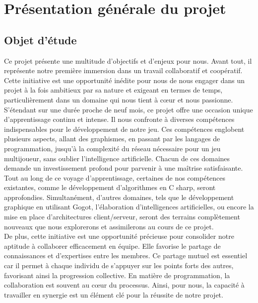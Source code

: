 \documentclass{article}
\begin{document}
\section{Présentation générale du projet}
\subsection{Objet d'étude}
Ce projet présente une multitude d'objectifs et d'enjeux pour nous. Avant tout, il représente notre première immersion dans un travail collaboratif et coopératif. Cette initiative est une opportunité inédite pour nous de nous engager dans un projet à la fois ambitieux par sa nature et exigeant en termes de temps, particulièrement dans un domaine qui nous tient à cœur et nous passionne.\\

S'étendant sur une durée proche de neuf mois, ce projet offre une occasion unique d'apprentissage continu et intense. Il nous confronte à diverses compétences indispensables pour le développement de notre jeu. Ces compétences englobent plusieurs aspects, allant des graphismes, en passant par les langages de programmation, jusqu'à la complexité du réseau nécessaire pour un jeu multijoueur, sans oublier l'intelligence artificielle. Chacun de ces domaines demande un investissement profond pour parvenir à une maîtrise satisfaisante.\\

Tout au long de ce voyage d'apprentissage, certaines de nos compétences existantes, comme le développement d'algorithmes en C sharp, seront approfondies. Simultanément, d'autres domaines, tels que le développement graphique en utilisant Gogot, l'élaboration d'intelligences artificielles, ou encore la mise en place d'architectures client/serveur, seront des terrains complètement nouveaux que nous explorerons et assimilerons au cours de ce projet.\\

De plus, cette initiative est une opportunité précieuse pour consolider notre aptitude à collaborer efficacement en équipe. Elle favorise le partage de connaissances et d'expertises entre les membres. Ce partage mutuel est essentiel car il permet à chaque individu de s'appuyer sur les points forts des autres, favorisant ainsi la progression collective. En matière de programmation, la collaboration est souvent au cœur du processus. Ainsi, pour nous, la capacité à travailler en synergie est un élément clé pour la réussite de notre projet.\\
\end{document}
